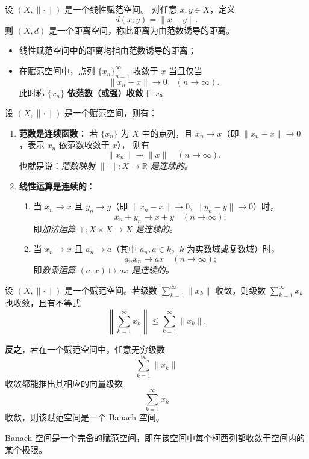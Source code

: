 \begin{note}
设 $(X,\|\cdot\|)$ 是一个线性赋范空间。  
对任意 $x,y \in X$，定义
\[
d(x,y) = \|x - y\|.
\]
则 $(X,d)$ 是一个距离空间，称此距离为由范数诱导的距离。

\begin{itemize}
  \item 线性赋范空间中的距离均指由范数诱导的距离；
  \item 在赋范空间中，点列 $\{x_n\}_{n=1}^\infty$ 收敛于 $x$ 当且仅当
  \[
  \|x_n - x\| \to 0 \quad (n \to \infty).
  \]
  此时称 $\{x_n\}$ \textbf{依范数（或强）收敛}于 $x$。
\end{itemize}
\end{note}
\begin{theorem}[赋范空间中范数与线性运算的连续性]
设 $(X,\|\cdot\|)$ 是一个赋范空间，则有：

\begin{enumerate}
  \item[\textbf{(1)}] \textbf{范数是连续函数}：  
  若 $\{x_n\}$ 为 $X$ 中的点列，且 $x_n \to x$（即 $\|x_n - x\| \to 0$，表示 $x_n$ 依范数收敛于 $x$），  
  则有
  \[
  \|x_n\| \to \|x\| \quad (n \to \infty).
  \]
  也就是说：\textit{范数映射 $\|\cdot\|:X\to\mathbb{R}$ 是连续的。}

  \item[\textbf{(2)}] \textbf{线性运算是连续的}：
  \begin{enumerate}
    \item 当 $x_n \to x$ 且 $y_n \to y$（即 $\|x_n-x\|\to0,\ \|y_n-y\|\to0$）时，
    \[
    x_n + y_n \to x + y \quad (n \to \infty);
    \]
    即\textit{加法运算 $+:X\times X\to X$ 是连续的。}
    \item 当 $x_n \to x$ 且 $a_n \to a$（其中 $a_n,a\in k$，$k$ 为实数域或复数域）时，
    \[
    a_n x_n \to a x \quad (n \to \infty);
    \]
    即\textit{数乘运算 $(a,x)\mapsto a x$ 是连续的。}
  \end{enumerate}
\end{enumerate}
\end{theorem}
\begin{definition}
设 $(X, \|\cdot\|)$ 是一个赋范空间。若级数
$
\sum_{k=1}^{\infty} \|x_k\| $
收敛，则级数
$
\sum_{k=1}^{\infty} x_k $
也收敛，且有不等式
\[
\left\| \sum_{k=1}^{\infty} x_k \right\|
\le \sum_{k=1}^{\infty} \|x_k\|.
\]

\textbf{反之}，若在一个赋范空间中，任意无穷级数
\[
\sum_{k=1}^{\infty} \|x_k\|
\]
收敛都能推出其相应的向量级数
\[
\sum_{k=1}^{\infty} x_k
\]
收敛，则该赋范空间是一个 Banach 空间。
\end{definition}
\begin{remark}
Banach 空间是一个完备的赋范空间，即在该空间中每个柯西列都收敛于空间内的某个极限。
\end{remark}
